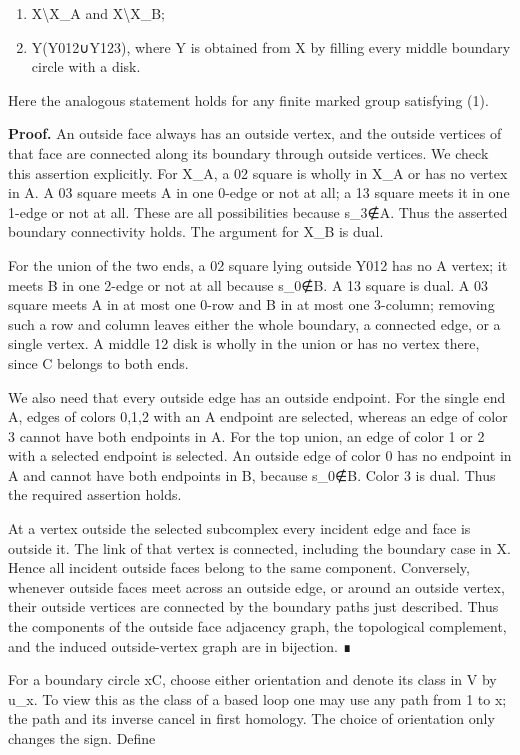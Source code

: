 \documentclass[
  11pt,
  a4paper,
]{article}
\begin{document}
\begin{enumerate}
\def\labelenumi{(\alph{enumi})}
\item
  X\textbackslash X\_A and X\textbackslash X\_B;
\item
  Y(Y012∪Y123), where Y is obtained from X by filling every middle
  boundary circle with a disk.
\end{enumerate}

Here the analogous statement holds for any finite marked group
satisfying (1).

\textbf{Proof.} An outside face always has an outside vertex, and the
outside vertices of that face are connected along its boundary through
outside vertices. We check this assertion explicitly. For X\_A, a 02
square is wholly in X\_A or has no vertex in A. A 03 square meets A in
one 0-edge or not at all; a 13 square meets it in one 1-edge or not at
all. These are all possibilities because s\_3∉A. Thus the asserted
boundary connectivity holds. The argument for X\_B is dual.

For the union of the two ends, a 02 square lying outside Y012 has no A
vertex; it meets B in one 2-edge or not at all because s\_0∉B. A 13
square is dual. A 03 square meets A in at most one 0-row and B in at
most one 3-column; removing such a row and column leaves either the
whole boundary, a connected edge, or a single vertex. A middle 12 disk
is wholly in the union or has no vertex there, since C belongs to both
ends.

We also need that every outside edge has an outside endpoint. For the
single end A, edges of colors 0,1,2 with an A endpoint are selected,
whereas an edge of color 3 cannot have both endpoints in A. For the top
union, an edge of color 1 or 2 with a selected endpoint is selected. An
outside edge of color 0 has no endpoint in A and cannot have both
endpoints in B, because s\_0∉B. Color 3 is dual. Thus the required
assertion holds.

At a vertex outside the selected subcomplex every incident edge and face
is outside it. The link of that vertex is connected, including the
boundary case in X. Hence all incident outside faces belong to the same
component. Conversely, whenever outside faces meet across an outside
edge, or around an outside vertex, their outside vertices are connected
by the boundary paths just described. Thus the components of the outside
face adjacency graph, the topological complement, and the induced
outside-vertex graph are in bijection. ∎

For a boundary circle xC, choose either orientation and denote its class
in V by u\_x. To view this as the class of a based loop one may use any
path from 1 to x; the path and its inverse cancel in first homology. The
choice of orientation only changes the sign. Define
\end{document}
